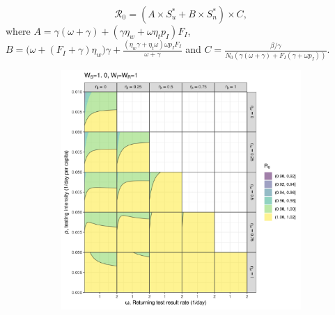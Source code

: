 \documentclass{article}
\newcommand{\Rnum}{\mathcal{R}_0}
\begin{document}
\begin{equation}
\label{R0}
\Rnum= (A \times S_u^* + B \times S_n^*) \times C, 
\end{equation}
where
$A=\gamma(\omega+\gamma) + (\gamma \eta_w + \omega \eta_t p_I) F_I$,
$B=\big(\omega+(F_I+\gamma)\eta_w\big) \gamma+\frac{(\eta_w \gamma+ \eta_t\omega) \omega p_I F_I }{\omega+\gamma}$ and 
$C=\frac{\beta/\gamma}{N_0 (\gamma(\omega+\gamma)+F_I(\gamma+\omega p_I))}$.

\begin{figure}[h!]
\centering
\begin{subfigure}[t]{.45\textwidth}
\centering
\includegraphics[width=\linewidth]{./pix/R0contour_random.png}
        \caption{}\label{fig:res1_a}
\end{subfigure}
%
\begin{subfigure}[t]{.45\textwidth}
\centering

\end{subfigure}
\end{figure}
\end{document}
